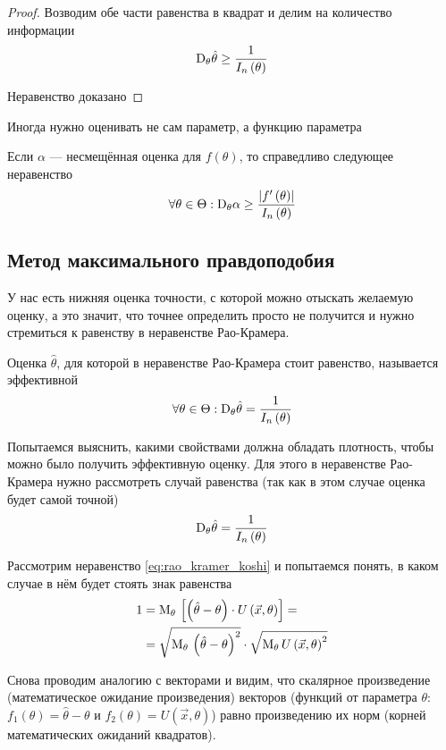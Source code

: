 \begin{proof}
    Возводим обе части равенства в квадрат и делим на количество информации
    $$\mathrm{D}_{\theta} \hat{\theta}\ge \frac{1}{I_n\left(\theta\right)}$$

    Неравенство доказано
\end{proof}
\begin{remark}
    Иногда нужно оценивать не сам параметр, а функцию параметра
\end{remark}

Если $\alpha$ --- несмещённая оценка для $f\left(\theta\right)$,
то справедливо следующее неравенство
$$\forall\theta\in\Theta:\mathrm{D}_{\theta} \alpha
    \ge\frac{\left|f'\left(\theta\right)\right|}{I_n\left(\theta\right)}$$

\subsection{Метод максимального правдоподобия}
У нас есть нижняя оценка точности,
с которой можно отыскать желаемую оценку, а это значит,
что точнее определить просто не получится
и нужно стремиться к равенству в неравенстве Рао-Крамера.

\begin{definition}
    Оценка $\hat{\theta}$,
    для которой в неравенстве Рао-Крамера стоит равенство,
    называется эффективной
    $$\forall\theta\in\Theta:
        \mathrm{D}_{\theta} \hat{\theta}=\frac{1}{I_n\left(\theta\right)}$$
\end{definition}

Попытаемся выяснить, какими свойствами должна обладать плотность,
чтобы можно было получить эффективную оценку.
Для этого в неравенстве Рао-Крамера нужно рассмотреть случай равенства
(так как в этом случае оценка будет самой точной)
    $$\mathrm{D}_{\theta} \hat{\theta}=\frac{1}{I_n\left(\theta\right)}$$

Рассмотрим неравенство \eqref{eq:rao_kramer_koshi} и попытаемся понять,
в каком случае в нём будет стоять знак равенства
\begin{align*}
    1&=\mathrm{M}_{\theta}\,
        \left[\left(\hat{\theta}-\theta\right)
            \cdot U\left( \vec{x},\theta \right)\right]=\\
    &=\sqrt{\mathrm{M}_{\theta}\,
        \left(\hat{\theta}-\theta\right)^2}
        \cdot\sqrt{\mathrm{M}_{\theta}\,U\left( \vec{x},\theta \right)^2}
\end{align*}

Снова проводим аналогию с векторами и видим,
что скалярное произведение (математическое ожидание произведения)
векторов
(функций от параметра $\theta$:
$f_1\left( \theta \right)=\hat{\theta}-\theta$ и
$f_2\left( \theta \right)=U\left( \vec{x},\theta \right)$)
равно произведению их норм (корней математических ожиданий квадратов).

